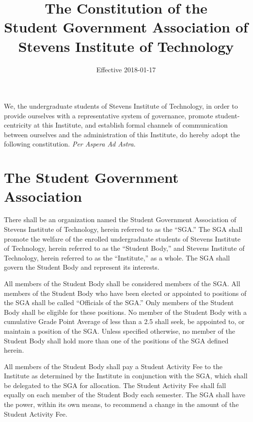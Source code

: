 \documentclass[12pt,oneside]{scrreprt}
\begin{document}
\title{The Constitution of the \\ Student Government Association of \\ Stevens Institute of Technology}
\date{Effective 2018-01-17}
\maketitle

\tableofcontents

\modulolinenumbers[1]
\linenumbers

We, the undergraduate students of Stevens Institute of Technology, in order to provide ourselves with a representative system of governance, promote student-centricity at this Institute, and establish formal channels of communication between ourselves and the administration of this Institute, do hereby adopt the following constitution. \textit{Per Aspera Ad Astra}.

\chapter{The Student Government Association}
There shall be an organization named the Student Government Association of Stevens Institute of Technology, herein referred to as the ``SGA.'' The SGA shall promote the welfare of the enrolled undergraduate students of Stevens Institute of Technology, herein referred to as the ``Student Body,'' and Stevens Institute of Technology, herein referred to as the ``Institute,'' as a whole. The SGA shall govern the Student Body and represent its interests.

All members of the Student Body shall be considered members of the SGA. All members of the Student Body who have been elected or appointed to positions of the SGA shall be called ``Officials of the SGA.'' Only members of the Student Body shall be eligible for these positions. No member of the Student Body with a cumulative Grade Point Average of less than a 2.5 shall seek, be appointed to, or maintain a position of the SGA. Unless specified otherwise, no member of the Student Body shall hold more than one of the positions of the SGA defined herein.

All members of the Student Body shall pay a Student Activity Fee to the Institute as determined by the Institute in conjunction with the SGA, which shall be delegated to the SGA for allocation. The Student Activity Fee shall fall equally on each member of the Student Body each semester. The SGA shall have the power, within its own means, to recommend a change in the amount of the Student Activity Fee.
\end{document}
